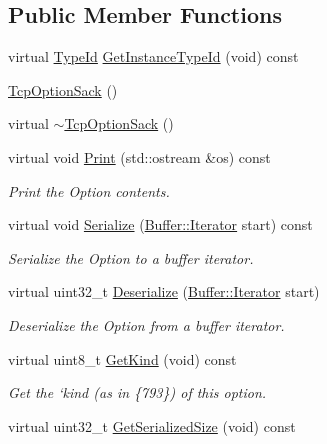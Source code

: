 \subsection*{Public Member Functions}
\begin{DoxyCompactItemize}
\item 
virtual \hyperlink{classns3_1_1TypeId}{Type\+Id} \hyperlink{classns3_1_1TcpOptionSack_aa43497f4f44bb4958ad8a4bd80fb517a}{Get\+Instance\+Type\+Id} (void) const 
\item 
\hyperlink{classns3_1_1TcpOptionSack_a896a1da9162a1c776d93999fdc0653d0}{Tcp\+Option\+Sack} ()
\item 
virtual \hyperlink{classns3_1_1TcpOptionSack_a1302251bf62a52c2fa18655bbc758231}{$\sim$\+Tcp\+Option\+Sack} ()
\item 
virtual void \hyperlink{classns3_1_1TcpOptionSack_afe44f44505cb4f89edca9eb1bf263f14}{Print} (std\+::ostream \&os) const 
\begin{DoxyCompactList}\small\item\em Print the Option contents. \end{DoxyCompactList}\item 
virtual void \hyperlink{classns3_1_1TcpOptionSack_abf2142e86a79a0549b256e58026d0083}{Serialize} (\hyperlink{classns3_1_1Buffer_1_1Iterator}{Buffer\+::\+Iterator} start) const 
\begin{DoxyCompactList}\small\item\em Serialize the Option to a buffer iterator. \end{DoxyCompactList}\item 
virtual uint32\+\_\+t \hyperlink{classns3_1_1TcpOptionSack_a8bc60b729045eb21b194d9ead50418e9}{Deserialize} (\hyperlink{classns3_1_1Buffer_1_1Iterator}{Buffer\+::\+Iterator} start)
\begin{DoxyCompactList}\small\item\em Deserialize the Option from a buffer iterator. \end{DoxyCompactList}\item 
virtual uint8\+\_\+t \hyperlink{classns3_1_1TcpOptionSack_a268360aadfb4bfedc51e347d8a0d03a3}{Get\+Kind} (void) const 
\begin{DoxyCompactList}\small\item\em Get the `kind\textquotesingle{} (as in \{793\}) of this option. \end{DoxyCompactList}\item 
virtual uint32\+\_\+t \hyperlink{classns3_1_1TcpOptionSack_a4f9b493f57c759ee185d92785090bfd9}{Get\+Serialized\+Size} (void) const 

\end{DoxyCompactItemize}
